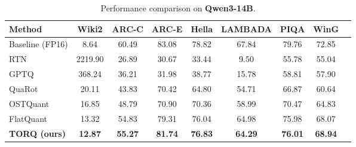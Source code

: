 \begin{table}[h!]
\centering
\caption{Performance comparison on \textbf{Qwen3-14B}.}
\label{tab:qwen3_14b_full}
\begin{tabular}{lcccccccc}
\toprule
\textbf{Method} & \textbf{Wiki2} & \textbf{ARC-C} & \textbf{ARC-E} & \textbf{Hella} & \textbf{LAMBADA} & \textbf{PIQA} & \textbf{WinG} \\
\midrule
Baseline (FP16) & 8.64 & 60.49 & 83.08 & 78.82 & 67.84 & 79.76 & 72.85 \\
\midrule
RTN & 2219.90 & 26.89 & 30.67 & 33.44 & 9.50 & 55.78 & 55.04 \\
GPTQ & 368.24 & 36.21 & 31.98 & 38.77 & 15.78 & 58.81 & 57.90 \\
QuaRot & 20.11 & 43.83 & 70.42 & 64.80 & 54.71 & 66.87 & 60.64 \\
OSTQuant & 16.85 & 48.79 & 70.90 & 70.36 & 58.99 & 70.47 & 64.83 \\
FlatQuant & 13.32 & 54.83 & 79.31 & 76.04 & 64.98 & 75.98 & 68.07 \\
\textbf{TORQ (ours)} & \textbf{12.87} & \textbf{55.27} & \textbf{81.74} & \textbf{76.83} & \textbf{64.29} & \textbf{76.01} & \textbf{68.94} \\
\bottomrule
\end{tabular}
\end{table}